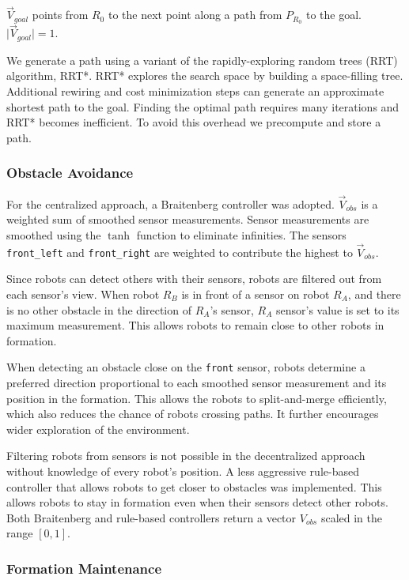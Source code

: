 \documentclass[letterpaper, 10 pt, conference]{ieeeconf}  %
\begin{document}
$\vec{V}_{goal}$ points from $R_0$ to the next point along a path from $P_{R_0}$ to the goal. $\vert\vec{V}_{goal}\rvert = 1$.

We generate a path using a variant of the rapidly-exploring random trees (RRT) algorithm, RRT*. RRT* explores the search space by building a space-filling tree. Additional rewiring and cost minimization steps can generate an approximate shortest path to the goal. Finding the optimal path requires many iterations and RRT* becomes inefficient. To avoid this overhead we precompute and store a path.

\subsubsection*{Obstacle Avoidance}

For the centralized approach, a Braitenberg controller was adopted. $\vec{V}_{obs}$ is a weighted sum of smoothed sensor measurements. Sensor measurements are smoothed using the $\tanh$ function to eliminate infinities. The sensors \texttt{front\_left} and \texttt{front\_right} are weighted to contribute the highest to $\vec{V}_{obs}$. 

Since robots can detect others with their sensors, robots are filtered out from each sensor's view. When robot $R_B$ is in front of a sensor on robot $R_A$, and there is no other obstacle in the direction of $R_A$'s sensor, $R_A$ sensor's value is set to its maximum measurement. This allows robots to remain close to other robots in formation.

When detecting an obstacle close on the \texttt{front} sensor, robots determine a preferred direction proportional to each smoothed sensor measurement and its position in the formation. This allows the robots to split-and-merge efficiently, which also reduces the chance of robots crossing paths. It further encourages wider exploration of the environment.

Filtering robots from sensors is not possible in the decentralized approach without knowledge of every robot's position. A less aggressive rule-based controller that allows robots to get closer to obstacles was implemented. This allows robots to stay in formation even when their sensors detect other robots. Both Braitenberg and rule-based controllers return a vector $V_{obs}$ scaled in the range $[0,1]$.

\subsubsection*{Formation Maintenance}
\end{document}
